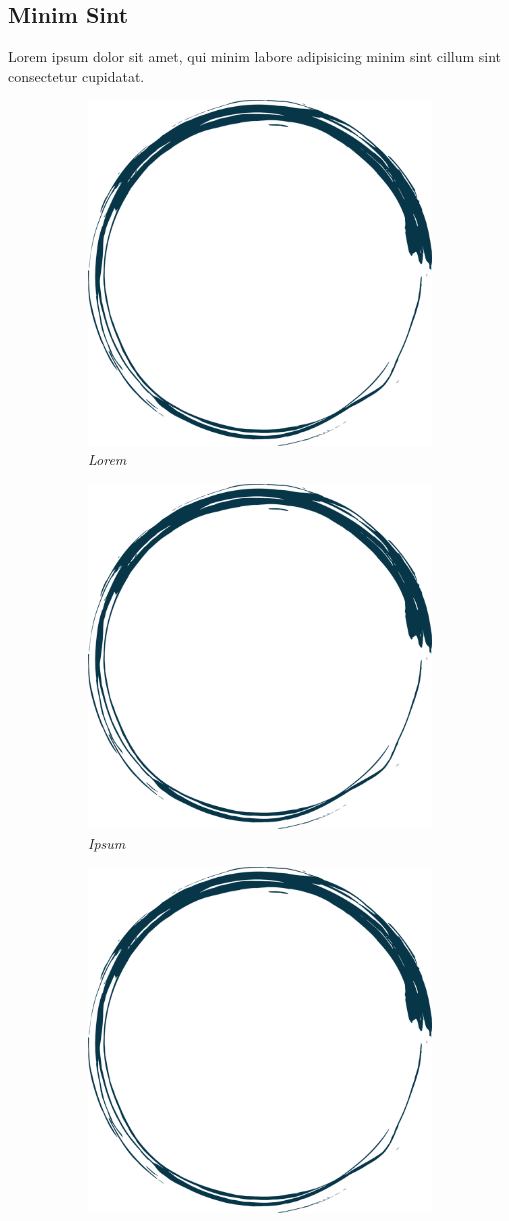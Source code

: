 \subsection{Minim Sint}
Lorem ipsum dolor sit amet, qui minim labore adipisicing minim sint cillum sint consectetur cupidatat.
\begin{figure}[H]
	\begin{subfigure}{.5\textwidth}
		\centering
		\includegraphics[width=.5\textwidth]{pictures/placeholder.png}
		\caption{\textit{Lorem}}
		\label{fig:lorem}
	\end{subfigure}
	\begin{subfigure}{.5\textwidth}
		\centering
		\includegraphics[width=.5\textwidth]{pictures/placeholder.png}
		\caption{\textit{Ipsum}}
		\label{fig:ipsum}
	\end{subfigure}\newline
	\begin{subfigure}{.5\textwidth}
		\centering
		\includegraphics[width=.5\textwidth]{pictures/placeholder.png}

\end{subfigure}
\end{figure}
